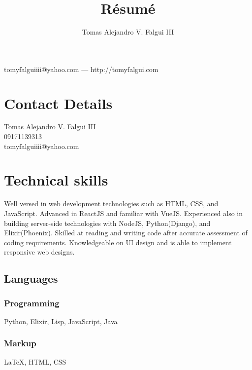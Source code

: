 \documentclass{article}
\makeatletter
\renewcommand{\maketitle}{
\begin{center}
    {\huge\bfseries
    \theauthor}

    \vspace{.25em}

    tomyfalguiiii@yahoo.com --- http://tomyfalgui.com
\end{center}

}
\makeatother
\begin{document}
    \title{R\'esum\'e}
    \author{Tomas Alejandro V. Falgui III}

    \maketitle

    \section{Contact Details}
    Tomas Alejandro V. Falgui III\\
    09171139313\\
    tomyfalguiiii@yahoo.com

    \section{Technical skills}



    Well versed in web development technologies such as HTML, CSS, and JavaScript. Advanced in ReactJS and familiar with VueJS. Experienced also in building server-side technologies with NodeJS, Python(Django), and Elixir(Phoenix). Skilled at reading and writing code after accurate assessment of coding requirements. Knowledgeable on UI design and is able to implement responsive web designs.


    \subsection{Languages}
    \subsubsection{Programming}

    Python, Elixir, Lisp, JavaScript, Java

    \subsubsection{Markup}
    {\LaTeX}, HTML, CSS

\end{document}
